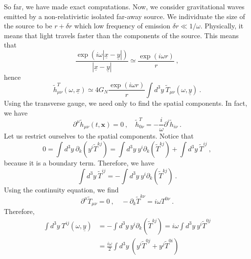     So far, we have made exact computations. Now, we consider gravitational waves emitted by a non-relativistic isolated far-away source. We individuate the size of the source to be $r + \delta r$ which low frequency of emission $\delta r \ll 1 / \omega$. Physically, it means that light travels faster than the components of the source. This means that
    \begin{equation*}
        \frac{\exp(i \omega |\underline x - \underline y|)}{|\underline x - \underline y|} \simeq \frac{\exp(i \omega r)}{r} ~, 
    \end{equation*}
    hence 
    \begin{equation*}
        \tilde h^T_{\mu\nu} (\omega, \underline x) \simeq 4 G_N \frac{\exp(i \omega r)}{r} \int d^3 y ~ \tilde T_{\mu\nu} (\omega, \underline{y}) ~.
    \end{equation*}
    Using the transverse gauge, we need only to find the spatial components. In fact, we have 
    \begin{equation*}
        \partial^\mu \tilde h_{\mu\nu} (t, \mathbf x) = 0~, \quad \tilde h^T_{0 \nu} = - \frac{i}{\omega} \partial^i \tilde h_{i \nu} ~.
    \end{equation*}
    Let us restrict ourselves to the spatial components. Notice that 
    \begin{equation*}
        0 = \int d^3 y ~ \partial_k (y^i \tilde T^{kj}) = \int d^3 y ~ y^i \partial_k (\tilde T^{kj}) + \int d^3 y ~ \tilde T^{ij} ~,
    \end{equation*}
    because it is a boundary term. Therefore, we have
    \begin{equation}\label{proof5}
        \int d^3 y ~ \tilde T^{ij} = - \int d^3 y ~ y^i \partial_k (\tilde T^{kj}) ~.
    \end{equation}
    Using the continuity equation, we find 
    \begin{equation*}
        \partial^\mu \tilde T_{\mu \nu} = 0 ~, \quad - \partial_k \tilde T^{k \nu} = i \omega T^{0 \nu} ~.
    \end{equation*}
    Therefore, 
    \begin{equation*}
    \begin{aligned}
        \int d^3 y ~ T^{ij} (\omega, \underline y) & = - \int d^3 y ~ y^i \partial_k (\tilde T^{kj}) = i \omega \int d^3 y ~ y^i \tilde T^{0j} \\ & = \frac{i \omega}{2} \int d^3 y ~ (y^i \tilde T^{0j} + y^j \tilde T^{0i}) 
    \end{aligned}
    \end{equation*}
